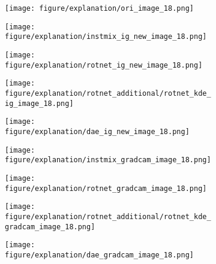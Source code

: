 \documentclass{article} \usepackage{iclr2021_conference,times}
\begin{document}
\begin{figure}[h!]
\begin{subfigure}{.11\textwidth}
  \centering
  \texttt{[image: figure/explanation/ori\_image\_18.png]}
\end{subfigure}
\hspace{-2mm}
\begin{subfigure}{.11\textwidth}
  \centering
  \texttt{[image: figure/explanation/instmix\_ig\_new\_image\_18.png]}
\end{subfigure}
\hspace{-2mm}
\begin{subfigure}{.11\textwidth}
  \centering
  \texttt{[image: figure/explanation/rotnet\_ig\_new\_image\_18.png]}
\end{subfigure}
\hspace{-2mm}
\begin{subfigure}{.11\textwidth}
  \centering
  \texttt{[image: figure/explanation/rotnet\_additional/rotnet\_kde\_ig\_image\_18.png]}
\end{subfigure}
\hspace{-2mm}
\begin{subfigure}{.11\textwidth}
  \centering
  \texttt{[image: figure/explanation/dae\_ig\_new\_image\_18.png]}
\end{subfigure}
\hspace{-2mm}
\begin{subfigure}{.11\textwidth}
  \centering
  \texttt{[image: figure/explanation/instmix\_gradcam\_image\_18.png]}
\end{subfigure}
\hspace{-2mm}
\begin{subfigure}{.11\textwidth}
  \centering
  \texttt{[image: figure/explanation/rotnet\_gradcam\_image\_18.png]}
\end{subfigure}
\hspace{-2mm}
\begin{subfigure}{.11\textwidth}
  \centering
  \texttt{[image: figure/explanation/rotnet\_additional/rotnet\_kde\_gradcam\_image\_18.png]}
\end{subfigure}
\hspace{-2mm}
\begin{subfigure}{.11\textwidth}
  \centering
  \texttt{[image: figure/explanation/dae\_gradcam\_image\_18.png]}
\end{subfigure}\\
\begin{subfigure}{.11\textwidth}

\end{subfigure}
\end{figure}
\end{document}
